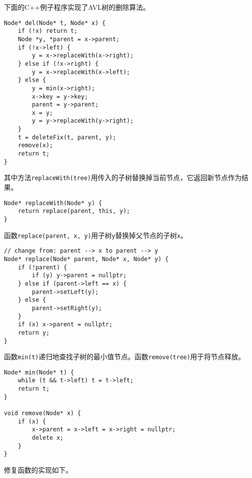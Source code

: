 \documentclass{ctexart}
\begin{document}
下面的C++例子程序实现了AVL树的删除算法。

\lstset{language=C++}
\begin{lstlisting}
Node* del(Node* t, Node* x) {
    if (!x) return t;
    Node *y, *parent = x->parent;
    if (!x->left) {
        y = x->replaceWith(x->right);
    } else if (!x->right) {
        y = x->replaceWith(x->left);
    } else {
        y = min(x->right);
        x->key = y->key;
        parent = y->parent;
        x = y;
        y = y->replaceWith(y->right);
    }
    t = deleteFix(t, parent, y);
    remove(x);
    return t;
}
\end{lstlisting}

其中方法\texttt{replaceWith(tree)}用传入的子树替换掉当前节点，它返回新节点作为结果。

\begin{lstlisting}
Node* replaceWith(Node* y) {
    return replace(parent, this, y);
}
\end{lstlisting}

函数\texttt{replace(parent, x, y)}用子树\texttt{y}替换掉父节点的子树\texttt{x}。

\begin{lstlisting}
// change from: parent --> x to parent --> y
Node* replace(Node* parent, Node* x, Node* y) {
    if (!parent) {
        if (y) y->parent = nullptr;
    } else if (parent->left == x) {
        parent->setLeft(y);
    } else {
        parent->setRight(y);
    }
    if (x) x->parent = nullptr;
    return y;
}
\end{lstlisting}

函数\texttt{min(t)}递归地查找子树的最小值节点。函数\texttt{remove(tree)}用于将节点释放。

\begin{lstlisting}
Node* min(Node* t) {
    while (t && t->left) t = t->left;
    return t;
}

void remove(Node* x) {
    if (x) {
        x->parent = x->left = x->right = nullptr;
        delete x;
    }
}
\end{lstlisting}

修复函数的实现如下。
\end{document}
